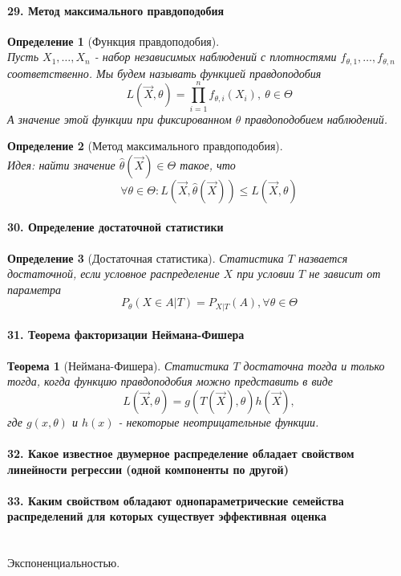 \documentclass[titlepage]{article}
\newtheorem{theorem}{Теорема}
\newtheorem{definition}{Определение}
\begin{document}
\paragraph{29. Метод максимального правдоподобия}
\begin{definition}[Функция правдоподобия] ~\\
	Пусть $X_1,\dots,X_n$ - набор независимых наблюдений с плотностями $f_{\theta,1},\dots,f_{\theta,n}$ соответственно. Мы будем называть функцией правдоподобия
	\[L(\vec X, \theta) = \prod_{i=1}^nf_{\theta,i}(X_i),\ \theta \in \Theta\]
	А значение этой функции при фиксированном $\theta$ правдоподобием наблюдений.
\end{definition}
\begin{definition}[Метод максимального правдоподобия] ~\\
	Идея: найти значение $\hat\theta(\vec X) \in \Theta$ такое, что
	\[\forall \theta \in \Theta: L(\vec X, \hat\theta(\vec X)) \leq L(\vec X, \theta)\]
\end{definition}

\paragraph{30. Определение достаточной статистики}
\begin{definition}[Достаточная статистика]
	Статистика $T$ назвается достаточной, если условное распределение $X$ при условии $T$ не зависит от параметра
	$$P_\theta(X\in A|T) = P_{X|T}(A),\forall \theta \in \Theta $$
\end{definition}

\paragraph{31. Теорема факторизации Неймана-Фишера}
\begin{theorem}[Неймана-Фишера]
	Статистика $T$ достаточна тогда и только тогда, когда функцию правдоподобия можно представить в виде
	\[L(\vec X, \theta) = g(T(\vec X),\theta)h(\vec X),\]
	где $g(x,\theta)$ и $h(x)$ - некоторые неотрицательные функции.
\end{theorem}

\paragraph{32. Какое известное двумерное распределение обладает свойством линейности регрессии (одной компоненты по другой)}

\paragraph{33. Каким свойством обладают однопараметрические семейства распределений для которых существует эффективная оценка} ~\\
Экспоненциальностью.
\end{document}
